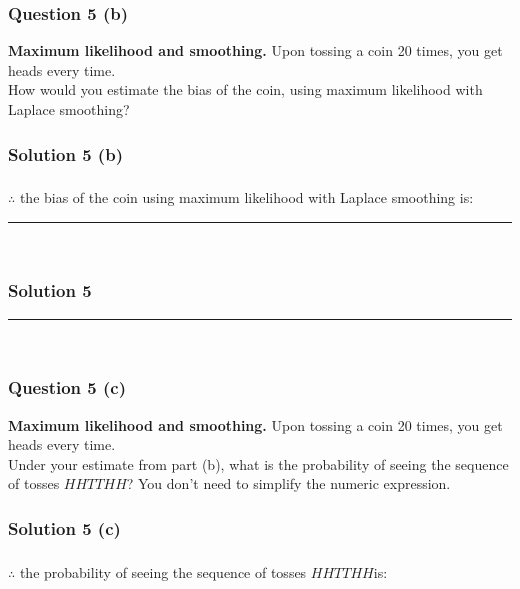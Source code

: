 \documentclass{article}
\begin{document}
\subsubsection*{Question 5 (b)}
\begin{flushleft}
    \textbf{Maximum likelihood and smoothing.} Upon tossing a coin 20 times, you get heads every time.\\
    How would you estimate the bias of the coin, using maximum likelihood with Laplace smoothing?
\end{flushleft}

\subsubsection*{Solution 5 (b)}


\subsubsection*{\normalfont}{$\therefore$ the bias of the coin using maximum likelihood with Laplace smoothing is:} \\

\noindent\rule{\textwidth}{0.4pt}\\

\newpage

\subsubsection*{Solution 5}
\noindent\rule{\textwidth}{0.4pt}\\
\subsubsection*{Question 5 (c)}
\begin{flushleft}
    \textbf{Maximum likelihood and smoothing.} Upon tossing a coin 20 times, you get heads every time.\\
    Under your estimate from part (b), what is the probability of seeing the sequence of tosses $HHTTHH$? You don't need to simplify the numeric expression.
\end{flushleft}

\subsubsection*{Solution 5 (c)}


\subsubsection*{\normalfont}{$\therefore$ the probability of seeing the sequence of tosses $HHTTHH$is:} \\
\end{document}
